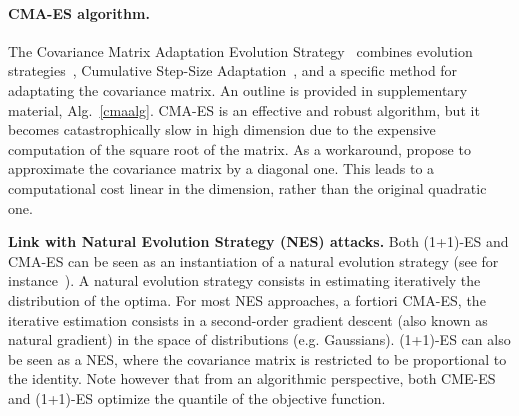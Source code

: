 \paragraph{CMA-ES algorithm.}
The Covariance Matrix Adaptation Evolution Strategy~\citep{HAN} combines
evolution strategies~\citep{Beyer:bookES}, Cumulative Step-Size Adaptation~\citep{csalinear}, and a specific method for adaptating the covariance matrix. %
An outline is provided in supplementary material, Alg.~\ref{cmaalg}. CMA-ES is an effective and robust algorithm, but it becomes catastrophically slow in high dimension due to the expensive computation of the square root of the matrix. As a workaround, \cite{diagcma} propose to  approximate the covariance matrix by a diagonal one. This leads to a computational cost linear in the dimension, rather than the original quadratic one. %


\textbf{Link with Natural Evolution Strategy (NES) attacks.} Both (1+1)-ES and CMA-ES can be seen as an instantiation of a natural  evolution strategy (see for instance~\cite{ollivier17igo,wierstra2014natural}). A natural evolution strategy consists in estimating iteratively the distribution of the optima. For most NES approaches, a fortiori CMA-ES, the iterative estimation consists in a second-order gradient descent (also known as natural gradient) in the space of distributions (e.g. Gaussians). (1+1)-ES can also be seen as a NES, where  the covariance matrix is restricted to be proportional to the identity. Note however that from an algorithmic perspective, both CME-ES and (1+1)-ES optimize the quantile of the objective function.%


